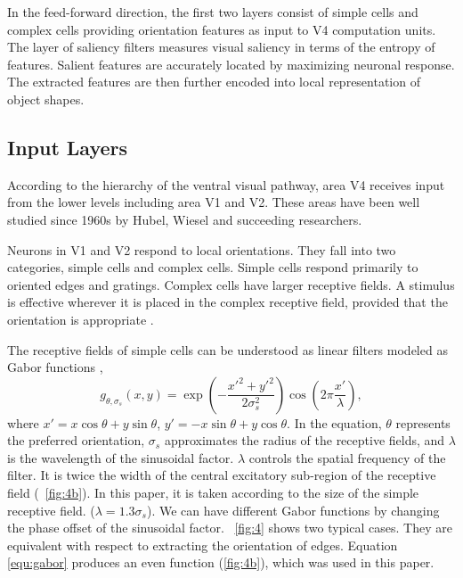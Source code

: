 \documentclass[conference]{IEEEtran}
\begin{document}
In the feed-forward direction,
the first two layers consist of simple cells and complex cells
providing orientation features as input to V4 computation units.
The layer of saliency filters measures visual saliency in terms of the entropy of features.
Salient features are accurately located by maximizing neuronal response.
The extracted features are then further encoded into local representation of object shapes.

\subsection{Input Layers}

According to the hierarchy of the ventral visual pathway,
area V4 receives input from the lower levels including area V1 and V2.
These areas have been well studied since 1960s 
by Hubel, Wiesel \cite{hubel1962,hubel1965} and succeeding researchers.

Neurons in V1 and V2 respond to local orientations.
They fall into two categories, simple cells and complex cells.
Simple cells respond primarily to oriented edges and gratings.
Complex cells have larger receptive fields.
A stimulus is effective wherever it is placed in the complex receptive field, 
provided that the orientation is appropriate \cite{hubel1962}.

The receptive fields of simple cells can be understood as linear filters 
modeled as Gabor functions \cite{gabor1946},
\begin{equation}\label{equ:gabor}
g_{\theta,\sigma_s}(x,y)
=\exp \left(-\frac{x'^2+y'^2}{2\sigma_s^2}\right)
\cos \left(2\pi\frac{x'}{\lambda}\right),
\end{equation}
where $x'=x\cos\theta+y\sin\theta$, $y'=-x\sin\theta+y\cos\theta$.
In the equation, $\theta$ represents the preferred orientation,
$\sigma_s$ approximates the radius of the receptive fields,
and $\lambda$ is the wavelength of the sinusoidal factor.
$\lambda$ controls the spatial frequency of the filter.
It is twice the width of the central excitatory sub-region of the receptive field
(\figurename~\ref{fig:4b}).
In this paper, it is taken according to the size of the simple receptive field.
($\lambda=1.3\sigma_s$).
We can have different Gabor functions by changing the phase offset of the sinusoidal factor.
\figurename~\ref{fig:4} shows two typical cases.
They are equivalent with respect to extracting the orientation of edges.
Equation \ref{equ:gabor} produces an even function (\figurename\ref{fig:4b}),
which was used in this paper.
\end{document}

